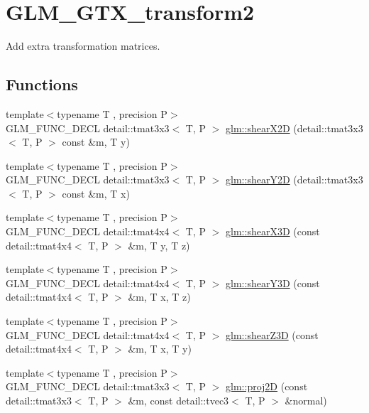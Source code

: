 \hypertarget{group__gtx__transform2}{}\section{G\+L\+M\+\_\+\+G\+T\+X\+\_\+transform2}
\label{group__gtx__transform2}


Add extra transformation matrices.  


\subsection*{Functions}
\begin{DoxyCompactItemize}
\item 
{\footnotesize template$<$typename T , precision P$>$ }\\G\+L\+M\+\_\+\+F\+U\+N\+C\+\_\+\+D\+E\+CL detail\+::tmat3x3$<$ T, P $>$ \hyperlink{group__gtx__transform2_gaa5a2d9216b3298b03252e549de6fd98a}{glm\+::shear\+X2D} (detail\+::tmat3x3$<$ T, P $>$ const \&m, T y)
\item 
{\footnotesize template$<$typename T , precision P$>$ }\\G\+L\+M\+\_\+\+F\+U\+N\+C\+\_\+\+D\+E\+CL detail\+::tmat3x3$<$ T, P $>$ \hyperlink{group__gtx__transform2_ga1f5e68ada7a56cdf86c0c56d0b0a1832}{glm\+::shear\+Y2D} (detail\+::tmat3x3$<$ T, P $>$ const \&m, T x)
\item 
{\footnotesize template$<$typename T , precision P$>$ }\\G\+L\+M\+\_\+\+F\+U\+N\+C\+\_\+\+D\+E\+CL detail\+::tmat4x4$<$ T, P $>$ \hyperlink{group__gtx__transform2_gaae5bbb490a3d798b083cbec0e0c2e94c}{glm\+::shear\+X3D} (const detail\+::tmat4x4$<$ T, P $>$ \&m, T y, T z)
\item 
{\footnotesize template$<$typename T , precision P$>$ }\\G\+L\+M\+\_\+\+F\+U\+N\+C\+\_\+\+D\+E\+CL detail\+::tmat4x4$<$ T, P $>$ \hyperlink{group__gtx__transform2_ga4b5af90ecf76d312bb371f6111e1ae35}{glm\+::shear\+Y3D} (const detail\+::tmat4x4$<$ T, P $>$ \&m, T x, T z)
\item 
{\footnotesize template$<$typename T , precision P$>$ }\\G\+L\+M\+\_\+\+F\+U\+N\+C\+\_\+\+D\+E\+CL detail\+::tmat4x4$<$ T, P $>$ \hyperlink{group__gtx__transform2_ga02fa747667daf42b64ea344d1076acee}{glm\+::shear\+Z3D} (const detail\+::tmat4x4$<$ T, P $>$ \&m, T x, T y)
\item 
{\footnotesize template$<$typename T , precision P$>$ }\\G\+L\+M\+\_\+\+F\+U\+N\+C\+\_\+\+D\+E\+CL detail\+::tmat3x3$<$ T, P $>$ \hyperlink{group__gtx__transform2_gad51e1fa33875b966db2f97cb7f21c48a}{glm\+::proj2D} (const detail\+::tmat3x3$<$ T, P $>$ \&m, const detail\+::tvec3$<$ T, P $>$ \&normal)

\end{DoxyCompactItemize}
